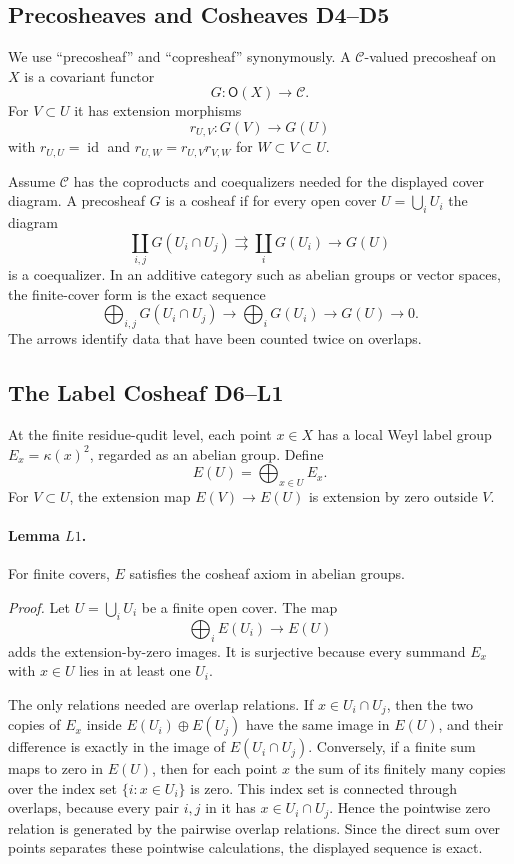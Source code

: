 \subsection{Precosheaves and Cosheaves D4--D5}

We use ``precosheaf'' and ``copresheaf'' synonymously.  A
\(\mathcal C\)-valued precosheaf on \(X\) is a covariant functor
\[
  G:\mathsf O(X)\longrightarrow\mathcal C.
\]
For \(V\subset U\) it has extension morphisms
\[
  r_{U,V}:G(V)\longrightarrow G(U)
\]
with \(r_{U,U}=\operatorname{id}\) and
\(r_{U,W}=r_{U,V}r_{V,W}\) for \(W\subset V\subset U\).

Assume \(\mathcal C\) has the coproducts and coequalizers needed for the
displayed cover diagram.  A precosheaf \(G\) is a cosheaf if for every open
cover \(U=\bigcup_iU_i\) the diagram
\[
  \coprod_{i,j}G(U_i\cap U_j)
  \rightrightarrows
  \coprod_iG(U_i)
  \longrightarrow
  G(U)
\]
is a coequalizer.  In an additive category such as abelian groups or vector
spaces, the finite-cover form is the exact sequence
\[
  \bigoplus_{i,j}G(U_i\cap U_j)
  \longrightarrow
  \bigoplus_iG(U_i)
  \longrightarrow
  G(U)\longrightarrow0.
\]
The arrows identify data that have been counted twice on overlaps.

\subsection{The Label Cosheaf D6--L1}

At the finite residue-qudit level, each point \(x\in X\) has a local Weyl
label group \(E_x=\kappa(x)^2\), regarded as an abelian group.  Define
\[
  E(U)=\bigoplus_{x\in U}E_x.
\]
For \(V\subset U\), the extension map \(E(V)\to E(U)\) is extension by zero
outside \(V\).

\paragraph{Lemma \(L1\).}
For finite covers, \(E\) satisfies the cosheaf axiom in abelian groups.

\emph{Proof.}
Let \(U=\bigcup_iU_i\) be a finite open cover.  The map
\[
  \bigoplus_iE(U_i)\longrightarrow E(U)
\]
adds the extension-by-zero images.  It is surjective because every summand
\(E_x\) with \(x\in U\) lies in at least one \(U_i\).

The only relations needed are overlap relations.  If \(x\in U_i\cap U_j\),
then the two copies of \(E_x\) inside \(E(U_i)\oplus E(U_j)\) have the same
image in \(E(U)\), and their difference is exactly in the image of
\(E(U_i\cap U_j)\).  Conversely, if a finite sum maps to zero in \(E(U)\),
then for each point \(x\) the sum of its finitely many copies over the index
set \(\{i:x\in U_i\}\) is zero.  This index set is connected through overlaps,
because every pair \(i,j\) in it has \(x\in U_i\cap U_j\).  Hence the
pointwise zero relation is generated by the pairwise overlap relations.  Since
the direct sum over points separates these pointwise calculations, the
displayed sequence is exact.

